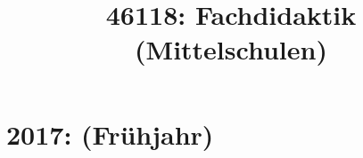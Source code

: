 \documentclass{lehramt-informatik-haupt}
\title{46118: Fachdidaktik (Mittelschulen)}
\begin{document}
\maketitle
\tableofcontents

\section{2017: (Frühjahr)}

\end{document}
